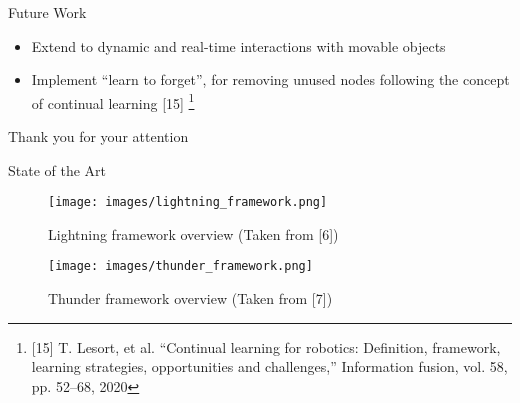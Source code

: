 \documentclass[aspectratio=169]{beamer}
\newcommand\blfootnote[1]{%
	\begingroup
	\renewcommand\thefootnote{}\footnote{#1}%
	\addtocounter{footnote}{-1}%
	\endgroup
}
\begin{document}
\begin{frame}{Future Work}
	\begin{itemize}
		\item Extend to dynamic and real-time interactions with movable objects
		\newline
		\item Implement “learn to forget”, for removing unused nodes following the concept of continual learning [15] \blfootnote{[15] T. Lesort, et al. “Continual learning for robotics: Definition, framework, learning strategies, opportunities and challenges,” Information fusion, vol. 58, pp. 52–68, 2020}
	\end{itemize}
\end{frame}



\begin{frame}
	Thank you for your attention
	
\end{frame}

\begin{frame}{State of the Art}
	\begin{minipage}{0.49\linewidth}	
		\begin{figure}[h!]
			\texttt{[image: images/lightning\_framework.png]}
			\caption{Lightning framework overview (Taken from [6])}
			\label{fig:qt_joint_references}
		\end{figure}
	\end{minipage}
	\begin{minipage}{0.49\linewidth}			
		\begin{figure}[h!]
			\texttt{[image: images/thunder\_framework.png]}
			\caption{Thunder framework overview (Taken from [7])}
			\label{fig:qt_joint_references}
		\end{figure}
	\end{minipage}
\end{frame}
\end{document}
